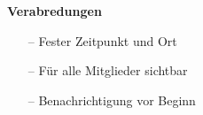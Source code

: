 \documentclass[aspectratio=1610]{beamer}
\begin{document}
\begin{frame}[plain]
\begin{minipage}{0.5\textwidth}
	\setlength{\fboxsep}{0pt}%
	\setlength{\fboxrule}{1pt}%
	\captionsetup{labelformat=empty}
	\centering
\end{minipage}%
\begin{minipage}{0.5\textwidth}
	\textbf{Verabredungen}
	\begin{itemize}
		\item[--] Fester Zeitpunkt und Ort
		\item[--] Für alle Mitglieder sichtbar
		\item[--] Benachrichtigung vor Beginn
	\end{itemize}
\end{minipage}
\end{frame}
\end{document}
